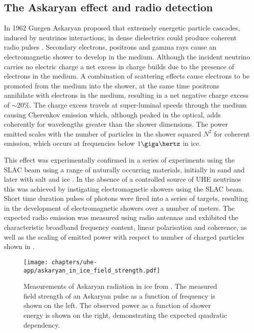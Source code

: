 \subsection{The Askaryan effect and radio detection}
\label{sec:uhe-app:UHEN:Askaryan}

In 1962 Gurgen Askaryan proposed that extremely energetic particle cascades, induced by neutrinos interactions, in dense dielectrics could produce coherent radio pulses \cite{Askaryan1965} \cite{Askaryan1962}. Secondary electrons, positrons and gamma rays cause an electromagnetic shower to develop in the medium. Although the incident neutrino carries no electric charge a net excess in charge builds due to the presence of electrons in the medium. A combination of scattering effects cause electrons to be promoted from the medium into the shower, at the same time positrons annihilate with electrons in the medium, resulting in a net negative charge excess of $\sim 20\%$. The charge excess travels at super-luminal speeds through the medium causing Cherenkov emission which, although peaked in the optical, adds coherently for wavelengths greater than the shower dimensions. The power emitted scales with the number of particles in the shower squared $N^{2}$ for coherent emission, which occurs at frequencies below $1\giga \hertz$ in ice. 

This effect was experimentally confirmed in a series of experiments using the SLAC beam using a range of naturally occurring materials, initially in sand \cite{PhysRevLett.86.2802} and later with salt \cite{PhysRevD.72.023002} and ice \cite{PhysRevLett.99.171101}. In the absence of a controlled source of UHE neutrinos this was achieved by instigating electromagnetic showers using the SLAC beam. Short time duration pulses of \GeV photons were fired into a series of targets, resulting in the development of electromagnetic showers over a number of meters. The expected radio emission was measured using radio antennas and exhibited the characteristic broadband frequency content, linear polarisation and coherence, as well as the scaling of emitted power with respect to number of charged particles  shown in .


\begin{figure}[htpb]
  \centering
  \texttt{[image: chapters/uhe-app/askaryan\_in\_ice\_field\_strength.pdf]}
  \caption{Measurements of Askaryan radiation in ice from \cite{PhysRevLett.99.171101}. The measured field strength of an Askaryan pulse as a function of frequency is shown on the left. The observed power as a function of shower energy is shown on the right, demonstrating the expected quadratic dependency.}
  \label{fig:uhe-app:UHEN:Askaryan:Askaryan_in_ice}
\end{figure}

